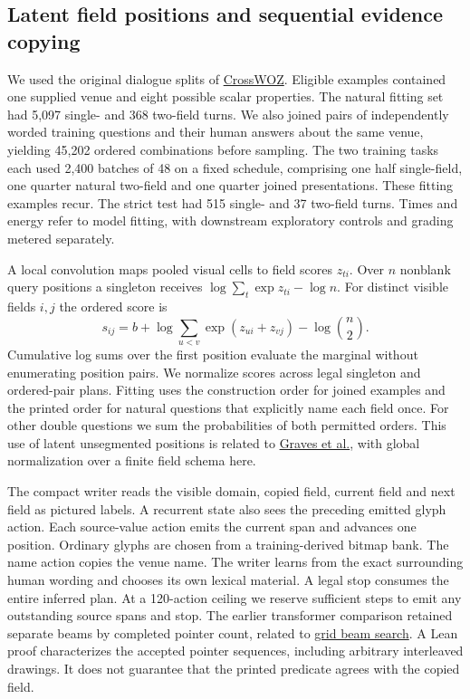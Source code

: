 \subsection*{Latent field positions and sequential evidence copying}
We used the original dialogue splits of \href{https://aclanthology.org/2020.tacl-1.19/}{CrossWOZ}. Eligible examples contained one supplied venue and eight possible scalar properties. The natural fitting set had 5,097 single- and 368 two-field turns. We also joined pairs of independently worded training questions and their human answers about the same venue, yielding 45,202 ordered combinations before sampling. The two training tasks each used 2,400 batches of 48 on a fixed schedule, comprising one half single-field, one quarter natural two-field and one quarter joined presentations. These fitting examples recur. The strict test had 515 single- and 37 two-field turns. Times and energy refer to model fitting, with downstream exploratory controls and grading metered separately.

A local convolution maps pooled visual cells to field scores $z_{ti}$. Over $n$ nonblank query positions a singleton receives $\log\sum_t \exp z_{ti}-\log n$. For distinct visible fields $i,j$ the ordered score is
\[
 s_{ij}=b+\log\sum_{u<v}\exp(z_{ui}+z_{vj})-\log {n\choose2}.
\]
Cumulative log sums over the first position evaluate the marginal without enumerating position pairs. We normalize scores across legal singleton and ordered-pair plans. Fitting uses the construction order for joined examples and the printed order for natural questions that explicitly name each field once. For other double questions we sum the probabilities of both permitted orders. This use of latent unsegmented positions is related to \href{https://www.cs.toronto.edu/~graves/icml_2006.pdf}{Graves et al.}, with global normalization over a finite field schema here.

The compact writer reads the visible domain, copied field, current field and next field as pictured labels. A recurrent state also sees the preceding emitted glyph action. Each source-value action emits the current span and advances one position. Ordinary glyphs are chosen from a training-derived bitmap bank. The name action copies the venue name. The writer learns from the exact surrounding human wording and chooses its own lexical material. A legal stop consumes the entire inferred plan. At a 120-action ceiling we reserve sufficient steps to emit any outstanding source spans and stop. The earlier transformer comparison retained separate beams by completed pointer count, related to \href{https://aclanthology.org/P17-1141/}{grid beam search}. A Lean proof characterizes the accepted pointer sequences, including arbitrary interleaved drawings. It does not guarantee that the printed predicate agrees with the copied field.


